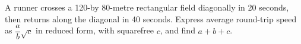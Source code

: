 A runner crosses a 120-by 80-metre rectangular field diagonally in 20 seconds, then returns along the diagonal in 40 seconds. Express average round-trip speed as $\dfrac{a}{b}\sqrt c$ in reduced form, with squarefree $c$, and find $a+b+c$.
